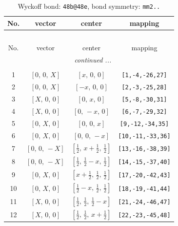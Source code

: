 \documentclass[fleqn,8pt]{jsarticle}
\begin{document}
\renewcommand{\arraystretch}{1.2}
\begin{longtable}{cccc}
\caption{Wyckoff bond: {\tt 48b@48e}, bond symmetry: {\tt mm2..}}
 \\
 \hline \hline
No. & vector & center & mapping \\ \hline \endfirsthead

\multicolumn{3}{l}{\tablename\ \thetable{}} \\
 \hline \hline
No. & vector & center & mapping \\ \hline \endhead

 \hline \hline
\multicolumn{3}{r}{\footnotesize\it continued ...} \\ \endfoot

 \hline \hline
\multicolumn{3}{r}{} \\ \endlastfoot

1 & $\left[ 0,\, 0,\, X \right]$ & $\left[ x,\, 0,\, 0 \right]$ & {\tt [1,-4,-26,27]} \\ \hline
2 & $\left[ 0,\, 0,\, X \right]$ & $\left[ - x,\, 0,\, 0 \right]$ & {\tt [2,-3,-25,28]} \\ \hline
3 & $\left[ X,\, 0,\, 0 \right]$ & $\left[ 0,\, x,\, 0 \right]$ & {\tt [5,-8,-30,31]} \\ \hline
4 & $\left[ X,\, 0,\, 0 \right]$ & $\left[ 0,\, - x,\, 0 \right]$ & {\tt [6,-7,-29,32]} \\ \hline
5 & $\left[ 0,\, X,\, 0 \right]$ & $\left[ 0,\, 0,\, x \right]$ & {\tt [9,-12,-34,35]} \\ \hline
6 & $\left[ 0,\, X,\, 0 \right]$ & $\left[ 0,\, 0,\, - x \right]$ & {\tt [10,-11,-33,36]} \\ \hline
7 & $\left[ 0,\, 0,\, - X \right]$ & $\left[ \frac{1}{2},\, x + \frac{1}{2},\, \frac{1}{2} \right]$ & {\tt [13,-16,-38,39]} \\ \hline
8 & $\left[ 0,\, 0,\, - X \right]$ & $\left[ \frac{1}{2},\, \frac{1}{2} - x,\, \frac{1}{2} \right]$ & {\tt [14,-15,-37,40]} \\ \hline
9 & $\left[ 0,\, X,\, 0 \right]$ & $\left[ x + \frac{1}{2},\, \frac{1}{2},\, \frac{1}{2} \right]$ & {\tt [17,-20,-42,43]} \\ \hline
10 & $\left[ 0,\, X,\, 0 \right]$ & $\left[ \frac{1}{2} - x,\, \frac{1}{2},\, \frac{1}{2} \right]$ & {\tt [18,-19,-41,44]} \\ \hline
11 & $\left[ X,\, 0,\, 0 \right]$ & $\left[ \frac{1}{2},\, \frac{1}{2},\, \frac{1}{2} - x \right]$ & {\tt [21,-24,-46,47]} \\ \hline
12 & $\left[ X,\, 0,\, 0 \right]$ & $\left[ \frac{1}{2},\, \frac{1}{2},\, x + \frac{1}{2} \right]$ & {\tt [22,-23,-45,48]} \\
\end{longtable}
\end{document}

